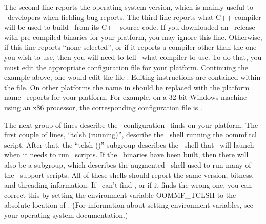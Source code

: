The second line reports the operating system version, which is mainly
useful to \OOMMF\ developers when fielding bug reports.  The third line
reports what C++ compiler will be used to build \OOMMF\ from its C++
source code.  If you downloaded an \OOMMF\ release with pre-compiled
binaries for your platform, you may ignore this line.  Otherwise, if
this line reports ``none selected'', or if it reports a compiler other
than the one you wish to use, then you will need to tell \OOMMF\ what
compiler to use.  To do that, you must edit the appropriate
configuration file for your platform.  Continuing the example above, one
would edit the file
.
Editing instructions are contained within the file.  On other platforms
the name  in 
should be replaced with the platform name \OOMMF\ reports for your
platform.  For example, on a 32-bit Windows machine using an x86
processor, the corresponding configuration file is
.

The next group of lines describe the \Tcl\ configuration \OOMMF\ finds
on your platform.  The first couple of lines, ``tclsh (running)'',
describe the \Tcl\ shell running the oommf.tcl script.  After that, the
``tclsh (\OOMMF)'' subgroup describes the \Tcl\ shell that \OOMMF\ will
launch when it needs to run \Tcl\ scripts.  If the \OOMMF\ binaries
have been built, then there will also be a  subgroup, which
describes the augmented \Tcl\ shell used to run many of the
\OOMMF\ support scripts.  All of these shells should report the same
version, bitness, and threading information.  If \OOMMF\ can't find
, or if it finds the wrong one, you can correct this by
setting the environment variable
OOMMF\_TCLSH to the absolute
location of .  (For information about setting environment
variables, see your operating system documentation.)

